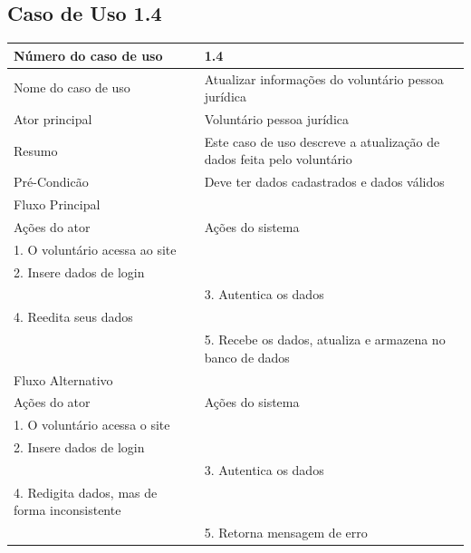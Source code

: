 


\newpage

  \subsection{Caso de Uso 1.4}
    \begin{table}[h]
    \begin{center}
    \begin{tabular}{|p{5cm}|p{10cm}|}
      \hline
      Número do caso de uso & 1.4\\
      \hline
      Nome do caso de uso   & Atualizar informações do voluntário pessoa jurídica\\
      \hline
      Ator principal        & Voluntário pessoa jurídica\\
      \hline
      Resumo                & Este caso de uso descreve a atualização de dados feita pelo voluntário\\
      \hline
      Pré-Condicão          & Deve ter dados cadastrados e dados válidos\\
      \hline
      Fluxo Principal       & \\
      \hline
      Ações do ator         & Ações do sistema \\
      \hline
      1. O voluntário acessa ao site & \\
      \hline
      2. Insere dados de login & \\
      \hline
      & 3. Autentica os dados\\
      \hline
      4. Reedita seus dados & \\
      \hline
      & 5. Recebe os dados, atualiza e armazena no banco de dados\\
      \hline
      Fluxo Alternativo & \\
      \hline
      Ações do ator & Ações do sistema\\
      \hline
      1. O voluntário acessa o site & \\
      \hline
      2. Insere dados de login & \\
      \hline
       & 3. Autentica os dados\\
      \hline
      4. Redigita dados, mas de forma inconsistente & \\
      \hline
      & 5. Retorna mensagem de erro\\
      \hline
    \end{tabular}
    \end{center}
    \end{table}

